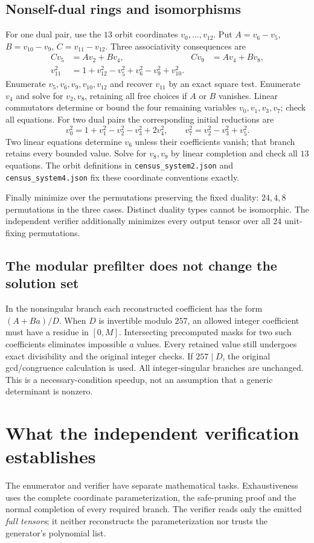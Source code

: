 \documentclass[11pt,a4paper]{article}
\theoremstyle{definition}\newtheorem{definition}[theorem]{Definition}\newtheorem{remark}[theorem]{Remark}
\begin{document}
\subsection{Nonself-dual rings and isomorphisms}
For one dual pair, use the $13$ orbit coordinates $v_0,\ldots,v_{12}$.
Put $A=v_6-v_5$, $B=v_{10}-v_9$, $C=v_{11}-v_{12}$.
Three associativity consequences are
\begin{align*}
Cv_5&=Av_2+Bv_4,& Cv_9&=Av_4+Bv_8,\\
v_{11}^2&=1+v_{12}^2-v_5^2+v_6^2-v_9^2+v_{10}^2.
\end{align*}
Enumerate $v_5,v_6,v_9,v_{10},v_{12}$ and recover $v_{11}$ by an exact
square test. Enumerate $v_4$ and solve for $v_2,v_8$, retaining all free
choices if $A$ or $B$ vanishes. Linear commutators determine or bound
the four remaining variables $v_0,v_1,v_3,v_7$; check all equations.
For two dual pairs the corresponding initial reductions are
\[
v_0^2=1+v_1^2-v_2^2-v_3^2+2v_4^2,\qquad
v_7^2=v_2^2-v_3^2+v_5^2.
\]
Two linear equations determine $v_6$ unless their coefficients vanish;
that branch retains every bounded value. Solve for $v_8,v_9$ by linear
completion and check all $13$ equations. The orbit definitions in
\texttt{census\_system2.json} and \texttt{census\_system4.json} fix these
coordinate conventions exactly.

Finally minimize over the permutations preserving the fixed duality:
$24,4,8$ permutations in the three cases. Distinct duality types cannot
be isomorphic. The independent verifier additionally minimizes every
output tensor over all $24$ unit-fixing permutations.

\subsection{The modular prefilter does not change the solution set}
In the nonsingular branch each reconstructed coefficient has the form
$(A+Ba)/D$. When $D$ is invertible modulo $257$, an allowed integer coefficient
must have a residue in $[0,M]$. Intersecting precomputed masks for two such
coefficients eliminates impossible $a$ values. Every retained value still
undergoes exact divisibility and the original integer checks. If $257\mid D$,
the original gcd/congruence calculation is used. All integer-singular branches
are unchanged. This is a necessary-condition speedup, not an assumption that
a generic determinant is nonzero.

\section{What the independent verification establishes}
The enumerator and verifier have separate mathematical tasks. Exhaustiveness
uses the complete coordinate parameterization, the safe-pruning proof and the
normal completion of every required branch. The verifier reads only the emitted
\emph{full tensors}; it neither reconstructs the parameterization nor trusts the
generator's polynomial list.
\end{document}
